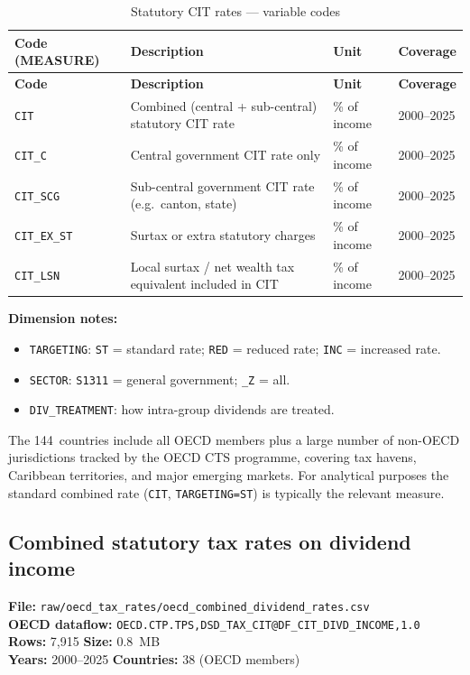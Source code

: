 \documentclass[11pt,a4paper]{article}
\newcommand{\code}[1]{\texttt{#1}}
\begin{document}
\begin{longtable}{@{}L{2.8cm} L{6.0cm} C{1.8cm} C{2.5cm}@{}}
\caption{Statutory CIT rates --- variable codes}\label{tab:cit_rates}\\
\toprule
\textbf{Code (MEASURE)} & \textbf{Description} & \textbf{Unit} & \textbf{Coverage} \\
\midrule
\endfirsthead
\toprule
\textbf{Code} & \textbf{Description} & \textbf{Unit} & \textbf{Coverage} \\
\midrule
\endhead
\bottomrule
\endlastfoot
\code{CIT}       & Combined (central + sub-central) statutory CIT rate & \% of income & 2000--2025 \\
\code{CIT\_C}    & Central government CIT rate only & \% of income & 2000--2025 \\
\code{CIT\_SCG}  & Sub-central government CIT rate (e.g.\ canton, state) & \% of income & 2000--2025 \\
\code{CIT\_EX\_ST} & Surtax or extra statutory charges & \% of income & 2000--2025 \\
\code{CIT\_LSN}  & Local surtax / net wealth tax equivalent included in CIT & \% of income & 2000--2025 \\
\end{longtable}

\noindent\textbf{Dimension notes:}
\begin{itemize}[noitemsep]
    \item \texttt{TARGETING}: \texttt{ST} = standard rate; \texttt{RED} = reduced rate; \texttt{INC} = increased rate.
    \item \texttt{SECTOR}: \texttt{S1311} = general government; \texttt{\_Z} = all.
    \item \texttt{DIV\_TREATMENT}: how intra-group dividends are treated.
\end{itemize}

The 144~countries include all OECD members plus a large number of non-OECD jurisdictions tracked by the OECD CTS programme, covering tax havens, Caribbean territories, and major emerging markets.  For analytical purposes the standard combined rate (\texttt{CIT}, \texttt{TARGETING=ST}) is typically the relevant measure.

\subsection{Combined statutory tax rates on dividend income}

\textbf{File:} \texttt{raw/oecd\_tax\_rates/oecd\_combined\_dividend\_rates.csv}\\
\textbf{OECD dataflow:} \texttt{OECD.CTP.TPS,DSD\_TAX\_CIT@DF\_CIT\_DIVD\_INCOME,1.0}\\
\textbf{Rows:} 7{,}915 \quad \textbf{Size:} 0.8~MB\\
\textbf{Years:} 2000--2025 \quad \textbf{Countries:} 38 (OECD members)
\end{document}
